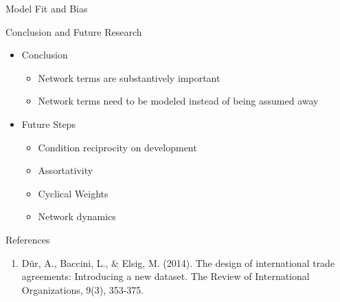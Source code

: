 \documentclass{beamer}
\begin{document}
\begin{frame}{Model Fit and Bias}
 


\end{frame}


\begin{frame}{Conclusion and Future Research}

\begin{itemize}
\item{Conclusion}
\begin{itemize}
\item{Network terms are substantively important}
\item{Network terms need to be modeled instead of being assumed away}
\end{itemize}
\item{Future Steps}
\begin{itemize}
\item{Condition reciprocity on development}
\item{Assortativity}
\item{Cyclical Weights}
\item{Network dynamics}
\end{itemize}
\end{itemize}


\end{frame}


\begin{frame}{References}
\begin{enumerate}
\item{D{\"u}r, A., Baccini, L., \& Elsig, M. (2014). The design of international trade agreements: Introducing a new dataset. The Review of International Organizations, 9(3), 353-375.}
\end{enumerate}
\end{frame}
\end{document}
